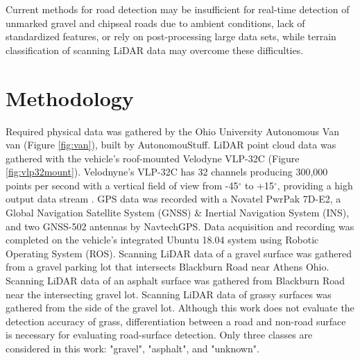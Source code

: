 \documentclass[journal,onecolumn]{IEEEtran}
\begin{document}
	{Current methods for road detection may be insufficient for real-time detection of unmarked gravel and chipseal roads due to ambient conditions, lack of standardized features, or rely on post-processing large data sets, while terrain classification of scanning LiDAR data may overcome these difficulties.}

\section{Methodology}

	{Required physical data was gathered by the Ohio University Autonomous Van van (Figure \ref{fig:van}), built by AutonomouStuff. LiDAR point cloud data was gathered with the vehicle's roof-mounted Velodyne VLP-32C (Figure \ref{fig:vlp32mount}). Velodnyne's VLP-32C has 32 channels producing 300,000 points per second with a vertical field of view from -45$^{\circ}$ to $+$15$^{\circ}$, providing a high output data stream \cite{vlp_32c}. GPS data was recorded with a Novatel PwrPak 7D-E2, a Global Navigation Satellite System (GNSS) \& Inertial Navigation System (INS), and two GNSS-502 antennas by NavtechGPS. Data acquisition and recording was completed on the vehicle's integrated Ubuntu 18.04 system using Robotic Operating System (ROS). Scanning LiDAR data of a gravel surface was gathered from a gravel parking lot that intersects Blackburn Road near Athens Ohio. Scanning LiDAR data of an asphalt surface was gathered from Blackburn Road near the intersecting gravel lot. Scanning LiDAR data of grassy surfaces was gathered from the side of the gravel lot. Although this work does not evaluate the detection accuracy of grass, differentiation between a road and non-road surface is necessary for evaluating road-surface detection. Only three classes are considered in this work: "gravel", "asphalt", and "unknown". }
	
\end{document}
